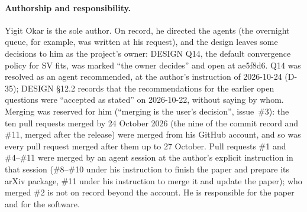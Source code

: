 \paragraph{Authorship and responsibility.}
Yigit Okar is the sole author.
On record, he directed the agents (the overnight queue, for example, was written at his request), and
the design leaves some decisions to him as the project's owner: DESIGN Q14, the default convergence
policy for SV fits, was marked ``the owner decides'' and open at ae5f8d6.
Q14 was resolved as an agent recommended, at the author's instruction of 2026-10-24 (D-35); DESIGN
\S12.2 records that the recommendations for the earlier open questions were ``accepted as stated''
on 2026-10-22, without saying by whom.
Merging was reserved for him (``merging is the user's decision'', issue~\#3): the ten pull requests
merged by 24 October 2026 (the nine of the commit record and \#11, merged after the release) were
merged from his GitHub account, and so was every pull request merged after them up to 27 October.
Pull requests \#1 and \#4--\#11 were merged by an agent session at the author's explicit
instruction in that session (\#8--\#10 under his instruction to finish the paper and prepare its
arXiv package, \#11 under his instruction to merge it and update the paper); who merged \#2 is not on record beyond the account.
He is responsible for the paper and for the software.

